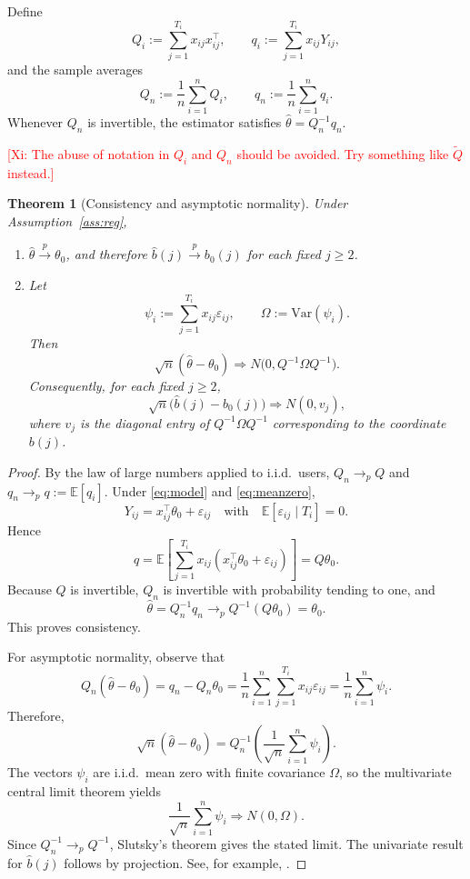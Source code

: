 \documentclass[sigconf,anonymous,review]{acmart}
\newtheorem{theorem}{Theorem}[section]
\newcommand{\xg}[1]{\textcolor{red}{[Xi: #1]}}
\begin{document}
Define
\[
Q_i:=\sum_{j=1}^{T_i} x_{ij}x_{ij}^\top,
\qquad
q_i:=\sum_{j=1}^{T_i} x_{ij}Y_{ij},
\]
and the sample averages
\[
Q_n:=\frac{1}{n}\sum_{i=1}^n Q_i,
\qquad
q_n:=\frac{1}{n}\sum_{i=1}^n q_i.
\]
Whenever $Q_n$ is invertible, the estimator satisfies $\hat\theta=Q_n^{-1}q_n$.

\xg{The abuse of notation in $Q_i$ and $Q_n$ should be avoided. Try something like $\tilde Q$ instead.}

\begin{theorem}[Consistency and asymptotic normality]
\label{thm:clt}
Under Assumption~\ref{ass:reg},
\begin{enumerate}
\item $\hat\theta\xrightarrow{p}\theta_0$, and therefore $\hat b(j)\xrightarrow{p} b_0(j)$ for each fixed $j\ge 2$.
\item Let
\[
\psi_i:=\sum_{j=1}^{T_i} x_{ij}\varepsilon_{ij},
\qquad
\Omega:=\mathrm{Var}(\psi_i).
\]
Then
\[
\sqrt{n}(\hat\theta-\theta_0)
\Rightarrow
N\!\bigl(0,Q^{-1}\Omega Q^{-1}\bigr).
\]
Consequently, for each fixed $j\ge 2$,
\[
\sqrt{n}\bigl(\hat b(j)-b_0(j)\bigr)\Rightarrow N(0,v_j),
\]
where $v_j$ is the diagonal entry of $Q^{-1}\Omega Q^{-1}$ corresponding to the coordinate $b(j)$.
\end{enumerate}
\end{theorem}

\begin{proof}
By the law of large numbers applied to i.i.d.\ users, $Q_n\to_p Q$ and $q_n\to_p q:=\mathbb{E}[q_i]$. Under \eqref{eq:model} and \eqref{eq:meanzero},
\[
Y_{ij}=x_{ij}^\top\theta_0+\varepsilon_{ij}
\quad\text{with}\quad
\mathbb{E}[\varepsilon_{ij}\mid T_i]=0.
\]
Hence
\[
q
=
\mathbb{E}\!\left[\sum_{j=1}^{T_i} x_{ij}(x_{ij}^\top\theta_0+\varepsilon_{ij})\right]
=
Q\theta_0.
\]
Because $Q$ is invertible, $Q_n$ is invertible with probability tending to one, and
\[
\hat\theta
=
Q_n^{-1}q_n
\to_p
Q^{-1}(Q\theta_0)
=
\theta_0.
\]
This proves consistency.

For asymptotic normality, observe that
\[
Q_n(\hat\theta-\theta_0)
=
q_n-Q_n\theta_0
=
\frac{1}{n}\sum_{i=1}^n \sum_{j=1}^{T_i} x_{ij}\varepsilon_{ij}
=
\frac{1}{n}\sum_{i=1}^n \psi_i.
\]
Therefore,
\[
\sqrt{n}(\hat\theta-\theta_0)
=
Q_n^{-1}
\left(
\frac{1}{\sqrt{n}}\sum_{i=1}^n \psi_i
\right).
\]
The vectors $\psi_i$ are i.i.d.\ mean zero with finite covariance $\Omega$, so the multivariate central limit theorem yields
\[
\frac{1}{\sqrt{n}}\sum_{i=1}^n \psi_i
\Rightarrow
N(0,\Omega).
\]
Since $Q_n^{-1}\to_p Q^{-1}$, Slutsky's theorem gives the stated limit. The univariate result for $\hat b(j)$ follows by projection. See, for example, \cite[Chapters~5--6]{vdV1998}.
\end{proof}
\end{document}
